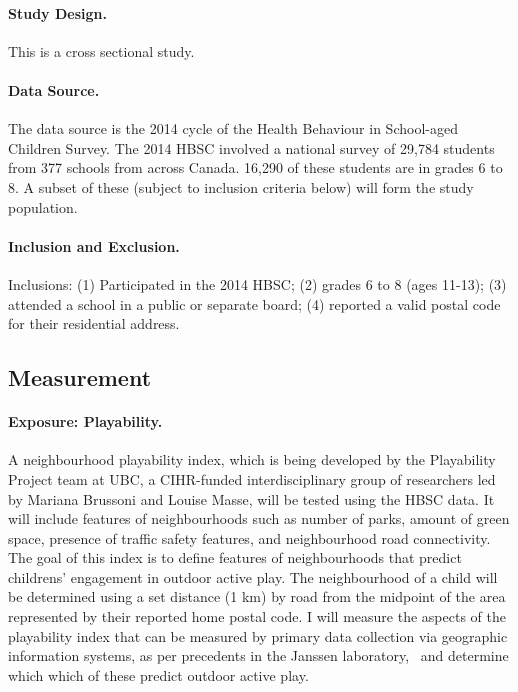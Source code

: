\documentclass [11pt]{article}
\begin{document}
\paragraph{Study Design. }This is a cross sectional study. 

\paragraph{Data Source.} The data source is the 2014 cycle of the Health Behaviour in School-aged Children Survey. The 2014 HBSC involved a national survey of 29,784 students from 377 schools from across Canada.  16,290 of these students are in grades 6 to 8. A subset of these (subject to inclusion criteria below) will form the study population.  

\paragraph{Inclusion and Exclusion.} Inclusions:  (1) Participated in the 2014 HBSC; (2) grades 6 to 8 (ages 11-13); (3) attended a school in a public or separate board; (4) reported a valid postal code for their residential address. 

\subsection{Measurement} 

\paragraph{Exposure: Playability.} A neighbourhood playability index, which is being developed by the Playability Project team at UBC, a CIHR-funded interdisciplinary group of researchers led by Mariana Brussoni and Louise Masse, will be tested using the HBSC data. It will include features of neighbourhoods such as number of parks, amount of green space, presence of traffic safety features, and neighbourhood road connectivity. The goal of this index is to define features of neighbourhoods that predict childrens' engagement in outdoor active play. The neighbourhood of a child will be determined using a set distance (1 km) by road from the midpoint of the area represented by their reported home postal code. I will measure the aspects of the playability index that can be measured by primary data collection via geographic information systems, as per precedents in the Janssen laboratory,~\cite{Carson2014-xh} and determine which which of these predict outdoor active play.
\end{document}
